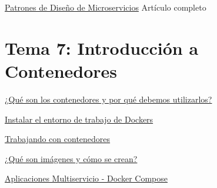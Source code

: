 \documentclass[12pt, twoside, openright]{report} %
\begin{document}
\href{https://towardsdatascience.com/microservice-architecture-and-its-10-most-important-design-patterns-824952d7fa41}{Patrones de Diseño de Microservicios} Artículo completo

\section{Tema 7: Introducción a Contenedores}
\href{https://learning.oreilly.com/library/view/getting-started-with/9781838645700/fb4efc86-2e13-4f11-94be-2485878464ca.xhtml}{¿Qué son los contenedores y por qué debemos utilizarlos?}

\href{https://learning.oreilly.com/library/view/getting-started-with/9781838645700/9f8c7bb0-cd1d-4dc3-8d6b-c08ef3590c44.xhtml}{Instalar el entorno de trabajo de Dockers}

\href{https://learning.oreilly.com/library/view/getting-started-with/9781838645700/ef53b9f7-3bd4-459e-9665-a53931a3ae0a.xhtml}{Trabajando con contenedores}

\href{https://learning.oreilly.com/library/view/getting-started-with/9781838645700/dd4d8c8e-9219-412e-853a-e52ea9de9183.xhtml}{¿Qué son imágenes y cómo se crean?}

\href{https://learning.oreilly.com/library/view/getting-started-with/9781838645700/ff4d6320-c32f-481e-8269-dbd7b5a7cec5.xhtml}{Aplicaciones Multiservicio - Docker Compose}
\end{document}
